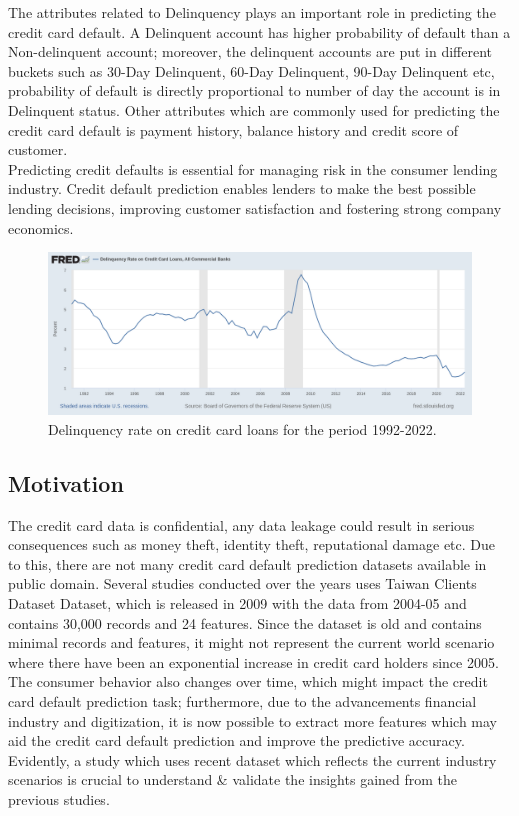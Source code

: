 \documentclass[twoside,11pt,a4paper]{article}
\begin{document}
The attributes related to Delinquency plays an important role in predicting the credit card default. A Delinquent account has higher probability of default than a Non-delinquent account; moreover, the delinquent accounts are put in different buckets such as 30-Day Delinquent, 60-Day Delinquent, 90-Day Delinquent etc, probability of default is directly proportional to number of day the account is in Delinquent status. Other attributes which are commonly used for predicting the credit card default is payment history, balance history and credit score of customer.\\

Predicting credit defaults is essential for managing risk in the consumer lending industry. Credit default prediction enables lenders to make the best possible lending decisions, improving customer satisfaction and fostering strong company economics. \\

\begin{figure}[ht]
	\centering
	\includegraphics[width=1.0\textwidth]{fredgraph}
	\caption[Delinquency rate on credit card loans for the period 1992-2022]{Delinquency rate on credit card loans for the period 1992-2022{\citep{fedgraph_delinquency_history}}.}
	\label{fig:fredgraph}
\end{figure}
\FloatBarrier
\subsection{Motivation}
The credit card data is confidential, any data leakage could result in serious consequences such as money theft, identity theft, reputational damage etc. Due to this, there are not many credit card default prediction datasets available in public domain. Several studies conducted over the years uses Taiwan Clients Dataset \citep{yeh2009comparisons} Dataset, which is released in 2009 with the data from 2004-05 and contains 30,000 records and 24 features. Since the dataset is old and contains minimal records and features, it might not represent the current world scenario where there have been an exponential increase in credit card holders since 2005. The consumer behavior also changes over time, which might impact the credit card default prediction task; furthermore, due to the advancements financial industry and digitization, it is now possible to extract more features which may aid the credit card default prediction and improve the predictive accuracy. Evidently, a study which uses recent dataset which reflects the current industry scenarios is crucial to understand \& validate the insights gained from the previous studies.\\
\end{document}
